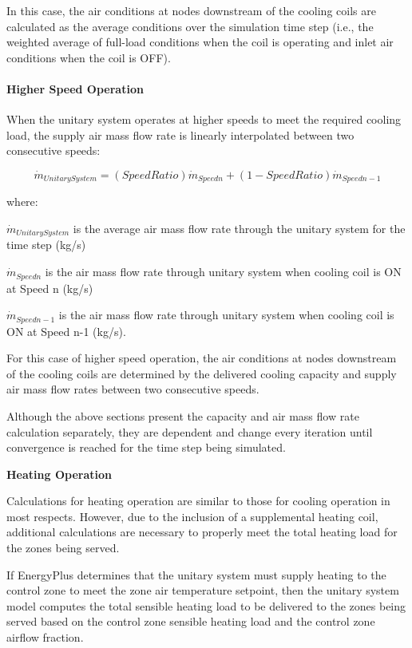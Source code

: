 In this case, the air conditions at nodes downstream of the cooling coils are calculated as the average conditions over the simulation time step (i.e., the weighted average of full-load conditions when the coil is operating and inlet air conditions when the coil is OFF).

\paragraph{Higher Speed Operation}\label{higher-speed-operation}

When the unitary system operates at higher speeds to meet the required cooling load, the supply air mass flow rate is linearly interpolated between two consecutive speeds:

\begin{equation}
{\dot{m}_{UnitarySystem}} = \left( {SpeedRatio} \right){\dot{m}_{Speedn}} + \left( {1 - SpeedRatio} \right){\dot{m}_{Speedn - 1}}
\end{equation}

where:

\(\dot{m}_{UnitarySystem}\) is the average air mass flow rate through the unitary system for the time step (kg/s)

\(\dot m_{Speedn}\) is the air mass flow rate through unitary system when cooling coil is ON at Speed n (kg/s)

\(\dot m_{Speedn - 1}\) is the air mass flow rate through unitary system when cooling coil is ON at Speed n-1 (kg/s).

For this case of higher speed operation, the air conditions at nodes downstream of the cooling coils are determined by the delivered cooling capacity and supply air mass flow rates between two consecutive speeds.

Although the above sections present the capacity and air mass flow rate calculation separately, they are dependent and change every iteration until convergence is reached for the time step being simulated.

\textbf{Heating Operation}

Calculations for heating operation are similar to those for cooling operation in most respects. However, due to the inclusion of a supplemental heating coil, additional calculations are necessary to properly meet the total heating load for the zones being served.

If EnergyPlus determines that the unitary system must supply heating to the control zone to meet the zone air temperature setpoint, then the unitary system model computes the total sensible heating load to be delivered to the zones being served based on the control zone sensible heating load and the control zone airflow fraction.


